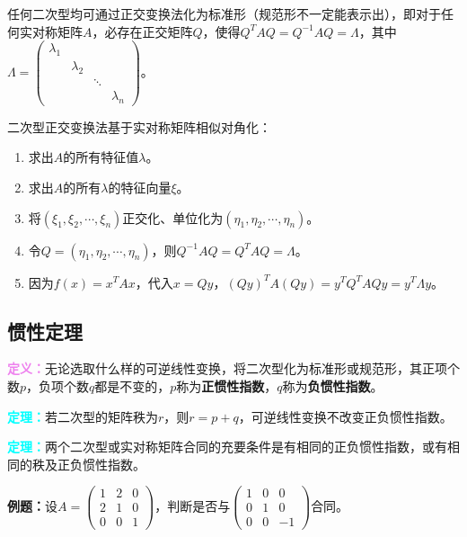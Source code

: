 任何二次型均可通过正交变换法化为标准形（规范形不一定能表示出），即对于任何实对称矩阵$A$，必存在正交矩阵$Q$，使得$Q^TAQ=Q^{-1}AQ=\Lambda$，其中$\Lambda=\left(\begin{array}{cccc}
    \lambda_1 \\
     & \lambda_2 \\
     & & \ddots \\
     & & & \lambda_n
\end{array}\right)$。

二次型正交变换法基于实对称矩阵相似对角化：

\begin{enumerate}
    \item 求出$A$的所有特征值$\lambda$。
    \item 求出$A$的所有$\lambda$的特征向量$\xi$。
    \item 将$(\xi_1,\xi_2,\cdots,\xi_n)$正交化、单位化为$(\eta_1,\eta_2,\cdots,\eta_n)$。
    \item 令$Q=(\eta_1,\eta_2,\cdots,\eta_n)$，则$Q^{-1}AQ=Q^TAQ=\Lambda$。
    \item 因为$f(x)=x^TAx$，代入$x=Qy$，$(Qy)^TA(Qy)=y^TQ^TAQy=y^T\Lambda y$。
\end{enumerate}

\subsection{惯性定理}

\textcolor{violet}{\textbf{定义：}}无论选取什么样的可逆线性变换，将二次型化为标准形或规范形，其正项个数$p$，负项个数$q$都是不变的，$p$称为\textbf{正惯性指数}，$q$称为\textbf{负惯性指数}。

\textcolor{aqua}{\textbf{定理：}}若二次型的矩阵秩为$r$，则$r=p+q$，可逆线性变换不改变正负惯性指数。

\textcolor{aqua}{\textbf{定理：}}两个二次型或实对称矩阵合同的充要条件是有相同的正负惯性指数，或有相同的秩及正负惯性指数。

\textbf{例题：}设$A=\left(\begin{array}{ccc}
    1 & 2 & 0 \\
    2 & 1 & 0 \\
    0 & 0 & 1
\end{array}\right)$，判断是否与$\left(\begin{array}{ccc}
    1 & 0 & 0 \\
    0 & 1 & 0 \\
    0 & 0 & -1
\end{array}\right)$合同。

